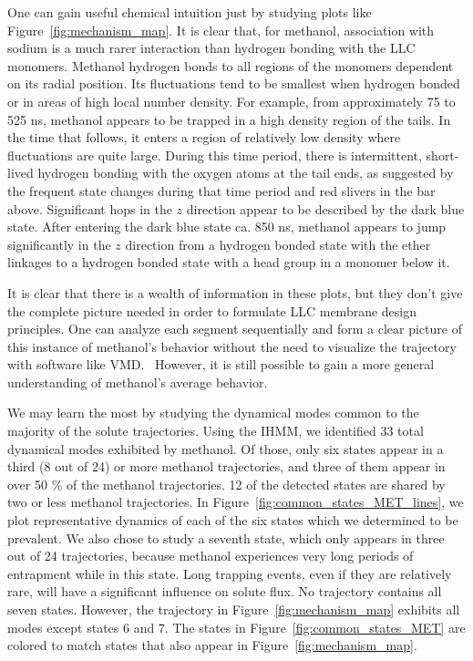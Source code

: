 \documentclass[journal=jpcbfk,manuscript=article]{achemso}
\begin{document}
  One can gain useful chemical intuition just by studying plots like
  Figure~\ref{fig:mechanism_map}. It is clear that, for methanol, association 
  with sodium is a much rarer interaction than hydrogen bonding with the 
  LLC monomers. Methanol hydrogen bonds to all regions of the monomers dependent
  on its radial position. Its fluctuations tend to be smallest when hydrogen bonded
  or in areas of high local number density. For example, from approximately 75 to 
  525 ns, methanol appears to be trapped in a high density region of the tails.
  In the time that follows, it enters a region of relatively low density where 
  fluctuations are quite large. During this time period, there is intermittent, 
  short-lived hydrogen bonding with the oxygen atoms at the tail ends, as suggested
  by the frequent state changes during that time period and red slivers in the bar
  above. Significant hops in the $z$ direction appear to be described by the dark blue
  state. After entering the dark blue state ca. 850 ns, methanol appears to jump
  significantly in the $z$ direction from a hydrogen bonded state with the ether 
  linkages to a hydrogen bonded state with a head group in a monomer below it.

  It is clear that there is a wealth of information in these plots, but they don't give
  the complete picture needed in order to formulate LLC membrane design principles. One
  can analyze each segment sequentially and form a clear picture of this instance of 
  methanol's behavior without the need to visualize the trajectory with software like VMD.~\cite{humphrey_vmd:_1996}
  However, it is still possible to gain a more general understanding of methanol's average
  behavior.
  
  We may learn the most by studying the dynamical modes common to the majority of 
  the solute trajectories. Using the IHMM, we identified 33 total dynamical modes 
  exhibited by methanol. Of those, only six states appear in a third (8 out of 24) 
  or more methanol trajectories, and three of them appear in over 50 \% of the 
  methanol trajectories. 12 of the detected states are shared by two or less 
  methanol trajectories. In Figure~\ref{fig:common_states_MET_lines}, we plot 
  representative dynamics of each of the six states which we determined to be prevalent.
  We also chose to study a seventh state, which only appears in three out of
  24 trajectories, because methanol experiences very long periods of entrapment
  while in this state. Long trapping events, even if they are relatively rare, will
  have a significant influence on solute flux. No trajectory contains all seven states.
  However, the trajectory in Figure~\ref{fig:mechanism_map} exhibits all modes except
  states 6 and 7. The states in Figure~\ref{fig:common_states_MET} are colored to match
  states that also appear in Figure~\ref{fig:mechanism_map}.
    
\end{document}
